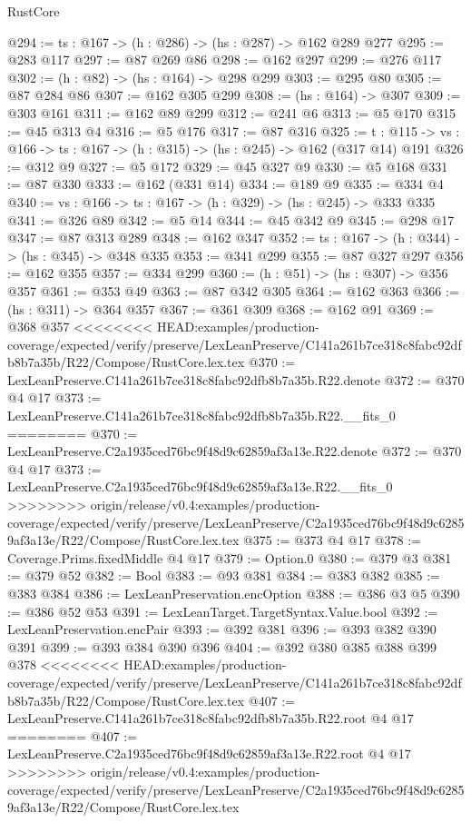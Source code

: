 \begin{lexlean}{RustCore}
\begin{coremodule}
{\begin{coremodule}
@294 := {ts : @167} -> (h : @286) -> (hs : @287) -> @162 @289 @277
@295 := @283 @117
@297 := @87 @269 @86
@298 := @162 @297
@299 := @276 @117
@302 := (h : @82) -> (hs : @164) -> @298 @299
@303 := @295 @80
@305 := @87 @284 @86
@307 := @162 @305 @299
@308 := (hs : @164) -> @307
@309 := @303 @161
@311 := @162 @89 @299
@312 := @241 @6
@313 := @5 @170
@315 := @45 @313 @4
@316 := @5 @176
@317 := @87 @316
@325 := {t : @115} ->
  {vs : @166} -> {ts : @167} -> (h : @315) -> (hs : @245) -> @162 (@317 @14) @191
@326 := @312 @9
@327 := @5 @172
@329 := @45 @327 @9
@330 := @5 @168
@331 := @87 @330
@333 := @162 (@331 @14)
@334 := @189 @9
@335 := @334 @4
@340 := {vs : @166} -> {ts : @167} -> (h : @329) -> (hs : @245) -> @333 @335
@341 := @326 @89
@342 := @5 @14
@344 := @45 @342 @9
@345 := @298 @17
@347 := @87 @313 @289
@348 := @162 @347
@352 := {ts : @167} -> (h : @344) -> (hs : @345) -> @348 @335
@353 := @341 @299
@355 := @87 @327 @297
@356 := @162 @355
@357 := @334 @299
@360 := (h : @51) -> (hs : @307) -> @356 @357
@361 := @353 @49
@363 := @87 @342 @305
@364 := @162 @363
@366 := (hs : @311) -> @364 @357
@367 := @361 @309
@368 := @162 @91
@369 := @368 @357
<<<<<<<< HEAD:examples/production-coverage/expected/verify/preserve/LexLeanPreserve/C141a261b7ce318c8fabc92dfb8b7a35b/R22/Compose/RustCore.lex.tex
@370 := LexLeanPreserve.C141a261b7ce318c8fabc92dfb8b7a35b.R22.denote
@372 := @370 @4 @17
@373 := LexLeanPreserve.C141a261b7ce318c8fabc92dfb8b7a35b.R22.__fits_0
========
@370 := LexLeanPreserve.C2a1935ced76bc9f48d9c62859af3a13e.R22.denote
@372 := @370 @4 @17
@373 := LexLeanPreserve.C2a1935ced76bc9f48d9c62859af3a13e.R22.__fits_0
>>>>>>>> origin/release/v0.4:examples/production-coverage/expected/verify/preserve/LexLeanPreserve/C2a1935ced76bc9f48d9c62859af3a13e/R22/Compose/RustCore.lex.tex
@375 := @373 @4 @17
@378 := Coverage.Prims.fixedMiddle @4 @17
@379 := Option.{0}
@380 := @379 @3
@381 := @379 @52
@382 := Bool
@383 := @93 @381
@384 := @383 @382
@385 := @383 @384
@386 := LexLeanPreservation.encOption
@388 := @386 @3 @5
@390 := @386 @52 @53
@391 := LexLeanTarget.TargetSyntax.Value.bool
@392 := LexLeanPreservation.encPair
@393 := @392 @381
@396 := @393 @382 @390 @391
@399 := @393 @384 @390 @396
@404 := @392 @380 @385 @388 @399 @378
<<<<<<<< HEAD:examples/production-coverage/expected/verify/preserve/LexLeanPreserve/C141a261b7ce318c8fabc92dfb8b7a35b/R22/Compose/RustCore.lex.tex
@407 := LexLeanPreserve.C141a261b7ce318c8fabc92dfb8b7a35b.R22.root @4 @17
========
@407 := LexLeanPreserve.C2a1935ced76bc9f48d9c62859af3a13e.R22.root @4 @17
>>>>>>>> origin/release/v0.4:examples/production-coverage/expected/verify/preserve/LexLeanPreserve/C2a1935ced76bc9f48d9c62859af3a13e/R22/Compose/RustCore.lex.tex

\end{coremodule}}
\end{coremodule}
\end{lexlean}
